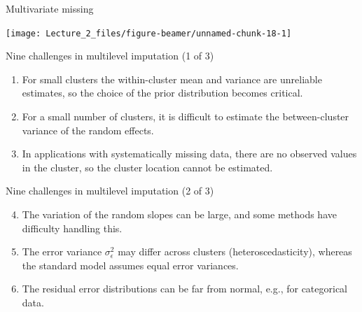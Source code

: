 \documentclass[ignorenonframetext,aspectratio=43]{beamer}
\begin{document}
\begin{frame}{Multivariate missing}
\protect\hypertarget{multivariate-missing}{}

\begin{center}\texttt{[image: Lecture\_2\_files/figure-beamer/unnamed-chunk-18-1]} \end{center}

\end{frame}

\begin{frame}{Nine challenges in multilevel imputation (1 of 3)}
\protect\hypertarget{nine-challenges-in-multilevel-imputation-1-of-3}{}

\begin{enumerate}
\item
  For small clusters the within-cluster mean and variance are unreliable
  estimates, so the choice of the prior distribution becomes critical.
\item
  For a small number of clusters, it is difficult to estimate the
  between-cluster variance of the random effects.
\item
  In applications with systematically missing data, there are no
  observed values in the cluster, so the cluster location cannot be
  estimated.
\end{enumerate}

\end{frame}

\begin{frame}{Nine challenges in multilevel imputation (2 of 3)}
\protect\hypertarget{nine-challenges-in-multilevel-imputation-2-of-3}{}

\begin{enumerate}
\setcounter{enumi}{3}
\item
  The variation of the random slopes can be large, and some methods have
  difficulty handling this.
\item
  The error variance \(\sigma_\epsilon^2\) may differ across clusters
  (heteroscedasticity), whereas the standard model assumes equal error
  variances.
\item
  The residual error distributions can be far from normal, e.g., for
  categorical data.
\end{enumerate}

\end{frame}
\end{document}
